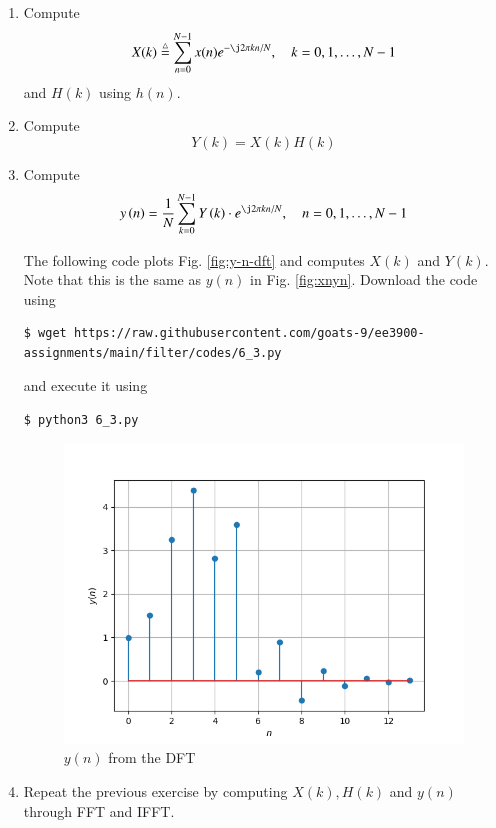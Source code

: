 \documentclass[journal,12pt,twocolumn]{IEEEtran}
\renewcommand\thesection{\arabic{section}}
\begin{document}
\begin{enumerate}[label=\thesection.\arabic*]
\item
Compute
\begin{equation}
X(k) \define \sum _{n=0}^{N-1}x(n) e^{-\j2\pi kn/N}, \quad k = 0,1,\dots, N-1
\end{equation}
and $H(k)$ using $h(n)$.
\item Compute 
\begin{equation}
Y(k) = X(k)H(k)
\label{eq:fp}
\end{equation}
\item Compute
\begin{equation}
y\brak{n}={\frac {1}{N}}\sum _{k=0}^{N-1}Y\brak{k}\cdot e^{\j 2\pi kn/N},\quad n = 0,1,\dots, N-1
\label{eq:inv-ft}
\end{equation}

\solution The following code plots Fig. \eqref{fig:y-n-dft} and computes $X(k)$
and $Y(k)$. Note that this is the same as $y(n)$ in Fig. \eqref{fig:xnyn}.
Download the code using
\begin{lstlisting}
$ wget https://raw.githubusercontent.com/goats-9/ee3900-assignments/main/filter/codes/6_3.py
\end{lstlisting}
and execute it using
\begin{lstlisting}
$ python3 6_3.py
\end{lstlisting}

\begin{figure}[!ht]
	\centering
	\includegraphics[width=\columnwidth]{figs/6_3.png}
	\caption{$y(n)$ from the DFT}
	\label{fig:y-n-dft}
\end{figure}
\item Repeat the previous exercise by computing $X(k), H(k)$ and $y(n)$ through FFT and 
IFFT.


\end{enumerate}
\end{document}
